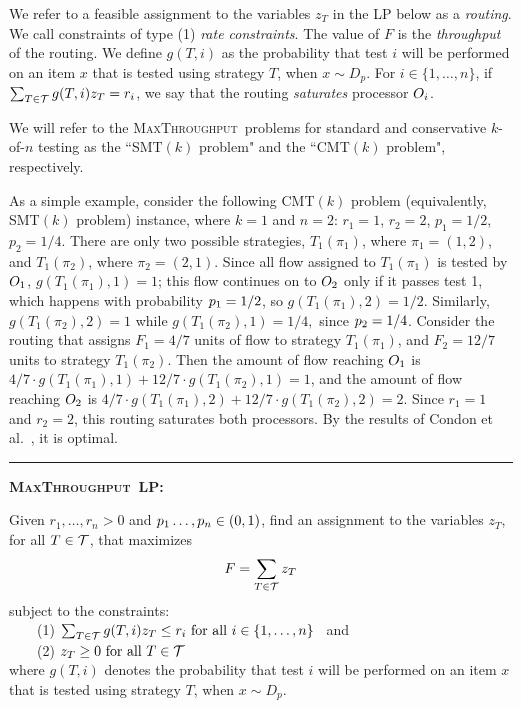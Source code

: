 \documentclass{article}
\newcounter{ass}
\newcommand{\ens}[1]{\ensuremath{#1}}					\newcommand{\card}[1]{\ens{|#1|}}							\newcommand{\dotlist}[2]{\ens{#1,\ldots,#2}}
\newcommand{\anitem}{\ens{x}}
\newcommand{\valn}{\ens{n}}
\newcommand{\valk}{\ens{k}}
\newcommand{\maxthru}{\textsc{MaxThroughput}}
\newcommand{\kofn}{\valk-of-\valn}
\newcommand{\strategy}{\ens{T}}
\newcommand{\thruput}{\ens{F}}
\newcommand{\processor}{processor}
\newcommand{\smt}{\textsf{SMT}$(\valk)$ problem}				\newcommand{\cmt}{\textsf{CMT}$(\valk)$ problem}
\newcommand{\test}[1]{\ens{#1}}										\newcommand{\cost}[1]{\ens{c_{#1}}}								\newcommand{\rate}[1]{\ens{r_{#1}}}								\newcommand{\resrate}[1]{\ens{r'_{#1}}}							\newcommand{\landprob}[2]{\ens{g(#1,#2)}}					\newcommand{\cstrat}[2]{\ens{\strategy^c_{#1}(#2)}}				\newcommand{\sstrat}[2]{\ens{\strategy^s_{#1}(#2)}}				\newcommand{\varz}[1]{\ens{z_{#1}}}								\newcommand{\vary}[1]{\ens{y_{#1}}}
\begin{document}
We refer to a feasible assignment to the variables $\varz{\strategy}$ in the LP below as a {\em routing}.
We call constraints of type (1) {\em rate constraints}.
The value of $\thruput$ is the {\em throughput} of the routing.
 We define $\landprob{\strategy}{i}$ as the probability that test $\test i$ will be performed on an item \anitem{} that is tested using strategy \strategy, when $\anitem \sim D_p$.
For $i \in \{1,\ldots,n\}$, if 
$\sum_{\strategy \in \stratspace} \landprob{\strategy}{i}\varz{\strategy} = \rate i$, 
we say that the routing {\em saturates} {\processor} $\op i$.

We will refer to the \maxthru\ problems for standard and conservative \kofn{} testing as the ``\smt" and the ``\cmt", respectively. 




As a simple example, consider 
the following \cmt{} (equivalently, \smt) instance, 
where $k=1$ and $n=2$: $r_1 = 1$, $r_2 = 2$, $p_1 = 1/2$, $p_2 = 1/4$.
There are only two possible strategies, $T_1(\pi_1)$, where $\pi_1 = (1,2)$,
and $T_1(\pi_2)$, where $\pi_2 = (2,1)$.  
Since all flow assigned to $T_1(\pi_1)$ is tested by $\op{1}$, $\landprob{T_1(\pi_1)}{1}=1$; 
this flow continues on to $\op{2}$ only if it passes test 1, which happens with probability $\pr{1} = 1/2$,
so $\landprob{T_1(\pi_1)}{2}=1/2$.  
Similarly, $\landprob{T_1(\pi_2)}{2}=1$ while $\landprob{T_1(\pi_2)}{1}=1/4,$ since $\pr{2} = 1/4$.
Consider the routing that assigns
$\thruput_1=4/7$ units of flow to strategy $T_1(\pi_1)$, and $\thruput_2=12/7$ units 
to strategy $T_1(\pi_2)$.  Then the amount of flow reaching $\op{1}$ is
$4/7\cdot\landprob{T_1(\pi_1)}{1}+ 12/7\cdot\landprob{T_1(\pi_2)}{1}=1$, 
and the amount of flow reaching $\op{2}$ is
$4/7\cdot\landprob{T_1(\pi_1)}{2}+ 12/7\cdot\landprob{T_1(\pi_2)}{2}=2$.  Since $\rate{1} = 1$ and $\rate{2} = 2$,
 this routing saturates both {\processor}s.   By the results of Condon et al.~\cite{journals/talg/CondonDHW09}, it is optimal.
 
 
\vspace{16pt}
\hrule
\vspace{6pt}

{\bf \noindent \maxthru\ LP:}

Given $\rate 1, \ldots, \rate{\valn} > 0$ and $\pr 1 \ldots, \pr{\valn} \in (0,1)$,
find an assignment to the variables $\varz{\strategy}$, for all $\strategy \in \stratspace$,
that maximizes
\[
\thruput = \sum_{\strategy \in \stratspace} \varz{\strategy}
\] 
subject to the constraints:\\[3pt] 
\mbox{\ \ \ \ }(1) $\sum_{\strategy \in \stratspace} \landprob{\strategy}{i}\varz{\strategy} \leq \rate i \mbox{ for all }i \in \{1, \ldots, \valn\}$
\mbox{ and }\\[3pt]
\mbox{\ \ \ \ }(2) $\varz{\strategy} \geq 0 \mbox{ for all }\strategy \in \stratspace$\\[3pt]
where 
$\landprob{\strategy}{i}$ denotes the probability that  test $\test i$ will be performed on an item \anitem{} that is tested using strategy \strategy, when $\anitem \sim D_p$.
\end{document}
